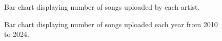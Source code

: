 \documentclass[article,pdftex,12pt,a4paper]{article}
\begin{document}
\begin{figure}
\centering
{}
\caption{Bar chart displaying number of songs uploaded by each artist.}
\label{figure_byArtistCount}
\end{figure}

\begin{figure}
\centering
{}
\caption{Bar chart displaying number of songs uploaded each year from 2010 to 2024.}
\label{figure_byYearCount}
\end{figure}
\end{document}

